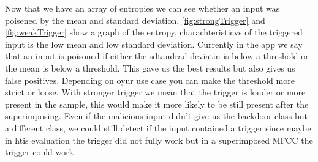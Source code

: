 \documentclass{report}
\theoremstyle{definition}
\theoremstyle{remark}
\begin{document}
Now that we have an array of entropies we can see whether an input was poisened by the mean and standard deviation. \autoref{fig:strongTrigger} and \autoref{fig:weakTrigger} show a graph of the entropy, charachteristicvs of the triggered input is the low mean and low standard deviation. Currently in the app we say that an input is poisoned if either the sdtandrad deviatin is below a threshold or the mean is below a threshold. This gave us the best results but also gives us false positives. Depending on oyur use case you can make the threshold more strict or loose. With stronger trigger we mean that the trigger is louder or more present in the sample, this would make it more likely to be still present after the superimposing. Even if the malicious input didn't give us the backdoor class but a different class, we could still detect if the input contained a trigger since maybe in htis evaluation the trigger did not fully work but in a superimposed MFCC the trigger could work. 
\end{document}
